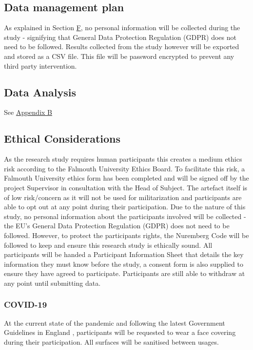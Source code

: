 \subsection{Data management plan}
As explained in Section \hyperref[ethics]{F}, no personal information will be collected during the study - signifying that General Data Protection Regulation (GDPR) \cite{gdpr} does not need to be followed. Results collected from the study however will be exported and stored as a CSV file. This file will be password encrypted to prevent any third party intervention.

\subsection{Data Analysis}
See \hyperref[append:b]{Appendix B}

\subsection{Ethical Considerations}\label{ethics}
As the research study requires human participants this creates a medium ethics risk according to the Falmouth University Ethics Board. To facilitate this risk, a Falmouth University ethics form has been completed and will be signed off by the project Supervisor in consultation with the Head of Subject. The artefact itself is of low risk/concern as it will not be used for militarization and participants are able to opt out at any point during their participation.
Due to the nature of this study, no personal information about the participants involved will be collected - the EU's General Data Protection Regulation (GDPR)\cite{gdpr} does not need to be followed. However, to protect the participants rights, the Nuremberg Code will be followed to keep and ensure this research study is ethically sound\cite{nuremberg-code}. All participants will be handed a Participant Information Sheet that details the key information they must know before the study, a consent form is also supplied to ensure they have agreed to participate. Participants are still able to withdraw at any point until submitting data.
\subsubsection*{COVID-19}
At the current state of the pandemic and following the latest Government Guidelines in England \cite{gov-guidlines}, participants will be requested to wear a face covering during their participation. All surfaces will be sanitised between usages.